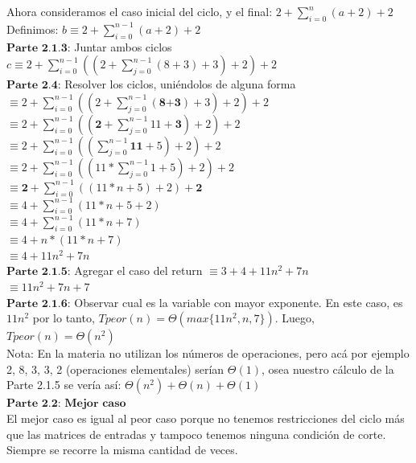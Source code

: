 \documentclass[10pt,a4paper]{article}
\begin{document}
Ahora consideramos el caso inicial del ciclo, y el final:
$ 2 + \sum_{i=0}^{n}{(a+2)} + 2 $ \\ 
Definimos:  $b \equiv 2 + \sum_{i=0}^{n-1}{(a+2)} + 2 $ \\
$\textbf{Parte 2.1.3}$: Juntar ambos ciclos
$c \equiv 2 + \sum_{i=0}^{n-1}{((2 + \sum_{j=0}^{n-1}{(8+3)} + 3)+2)} + 2 $ \\ 
$\textbf{Parte 2.4}$: Resolver los ciclos, uniéndolos de alguna forma \\
$\equiv 2 + \sum_{i=0}^{n-1}{((2 + \sum_{j=0}^{n-1}{(\textbf{8+3})} + 3)+2)} + 2 $ \\ 
$\equiv 2 + \sum_{i=0}^{n-1}{((\textbf{2} + \sum_{j=0}^{n-1}{11} + \textbf{3})+2)} + 2 $ \\ 
$\equiv 2 + \sum_{i=0}^{n-1}{((\sum_{j=0}^{n-1}{\textbf{11}} + 5)+2)} + 2 $ \\ 
$\equiv 2 + \sum_{i=0}^{n-1}{((11 * \sum_{j=0}^{n-1}{1} + 5)+2)} + 2 $ \\
$\equiv \textbf{2} + \sum_{i=0}^{n-1}{((11 * n + 5)+2)} + \textbf{2} $ \\  
$\equiv 4 + \sum_{i=0}^{n-1}{(11 * n + 5+2)} $ \\  
$\equiv 4 + \sum_{i=0}^{n-1}{(11 * n + 7)} $ \\
$\equiv 4 + n * (11 * n + 7) $ \\    
$\equiv 4 + 11n^{2} + 7n $ \\   
$\textbf{Parte 2.1.5}$: Agregar el caso del return 
$\equiv 3 + 4 + 11n^{2} + 7n $ \\   
$\equiv 11n^{2} + 7n + 7 $ \\
$\textbf{Parte 2.1.6}$: Observar cual es la variable con mayor exponente.
En este caso, es $11n^{2}$ por lo tanto, $T{peor}(n) = \Theta(max\{11n^{2}, n, 7\})$. Luego,  
$T{peor}(n) = \Theta(n^{2})$ \\ 
Nota: En la materia no utilizan los números de operaciones, pero acá por ejemplo 2, 8, 3, 3, 2 (operaciones elementales) serían $\Theta(1)$, osea nuestro cálculo de la Parte 2.1.5 se vería así: $\Theta(n^{2}) + \Theta(n) + \Theta(1)$ \\ 
$\textbf{Parte 2.2: Mejor caso}$ \\ 
El mejor caso es igual al peor caso porque no tenemos restricciones del ciclo más que las matrices de entradas y tampoco tenemos ninguna condición de corte. Siempre se recorre la misma cantidad de veces.
\end{document}
